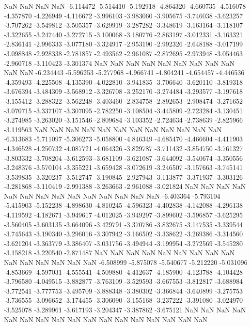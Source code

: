NaN
NaN
NaN
NaN
-6.114472
-5.514410
-5.192918
-4.864320
-4.660735
-4.516078
-4.357870
-4.226949
-4.116672
-3.996103
-3.983060
-3.905675
-3.746038
-3.623257
-3.707262
-3.549812
-3.505357
-3.629919
-3.287282
-3.348619
-3.163164
-3.118107
-3.322655
-3.247440
-3.272715
-3.100068
-3.180776
-2.863197
-3.012331
-3.163321
-2.836141
-2.996333
-3.077180
-3.324917
-2.953190
-2.992326
-2.648188
-3.017199
-3.098848
-2.928338
-2.781857
-2.493562
-2.961087
-2.872695
-2.973948
-3.054463
-2.960718
-3.110423
-3.301374
NaN
NaN
NaN
NaN
NaN
NaN
NaN
NaN
NaN
NaN
NaN
-6.234443
-5.596253
-5.277968
-4.966741
-4.804241
-4.654457
-4.446536
-4.359493
-4.225508
-4.135390
-4.022810
-3.941835
-3.706640
-3.620110
-3.819318
-3.676394
-3.484309
-3.568912
-3.326708
-3.252170
-3.274484
-3.293577
-3.197618
-3.155412
-3.288322
-3.562248
-3.403460
-2.834758
-2.892653
-2.908474
-3.271652
-3.070715
-3.337107
-3.307095
-2.782250
-3.108504
-3.445809
-2.723284
-3.130451
-3.274985
-3.263020
-3.151546
-2.809684
-3.103352
-2.724634
-2.738639
-2.825966
-3.119563
NaN
NaN
NaN
NaN
NaN
NaN
NaN
NaN
NaN
NaN
NaN
NaN
-6.313683
-5.711097
-5.306273
-5.058800
-4.846349
-4.685470
-4.466604
-4.411903
-4.346528
-4.250732
-4.087721
-4.064326
-3.829787
-3.711432
-3.854750
-3.761327
-3.803332
-3.708204
-3.612593
-3.681109
-3.621087
-3.644092
-3.540674
-3.350556
-3.248376
-3.570104
-3.355221
-3.659428
-3.072619
-3.246507
-3.157663
-3.745141
-3.539835
-3.320237
-3.512747
-3.190845
-2.927943
-3.113877
-3.371937
-3.303126
-3.281868
-3.110419
-2.991388
-3.263663
-2.961088
-3.021824
NaN
NaN
NaN
NaN
NaN
NaN
NaN
NaN
NaN
NaN
NaN
NaN
NaN
NaN
-6.403364
-5.793104
-5.415903
-5.152238
-4.898630
-4.810245
-4.596323
-4.402838
-4.142088
-4.296138
-4.119592
-4.182671
-3.949617
-4.012025
-3.949297
-3.899602
-3.596857
-3.625295
-3.560405
-3.603135
-3.664096
-3.429791
-3.370786
-3.832675
-3.147535
-3.339544
-3.745643
-3.190340
-3.296016
-3.307942
-3.166502
-3.338622
-3.269386
-3.314560
-3.621204
-3.363779
-3.386407
-3.031756
-3.494944
-3.199954
-3.272569
-3.545280
-3.158218
-3.220540
-2.871487
NaN
NaN
NaN
NaN
NaN
NaN
NaN
NaN
NaN
NaN
NaN
NaN
NaN
NaN
NaN
-6.508999
-5.875078
-5.540677
-5.212220
-5.031096
-4.853669
-4.597031
-4.555541
-4.509880
-4.412637
-4.185900
-4.123788
-4.104428
-3.796580
-4.049515
-3.882877
-3.763109
-3.529593
-3.667553
-3.812817
-3.688984
-3.772541
-3.777753
-3.495709
-3.888348
-3.380302
-3.366844
-3.640899
-3.275753
-3.736555
-3.096652
-3.174455
-3.306090
-3.155168
-3.237222
-3.391080
-3.024970
-3.525078
-3.289961
-3.617193
-3.204347
-3.387862
-3.675121
NaN
NaN
NaN
NaN
NaN
NaN
NaN
NaN
NaN
NaN
NaN
NaN
NaN
NaN
NaN
NaN
NaN
